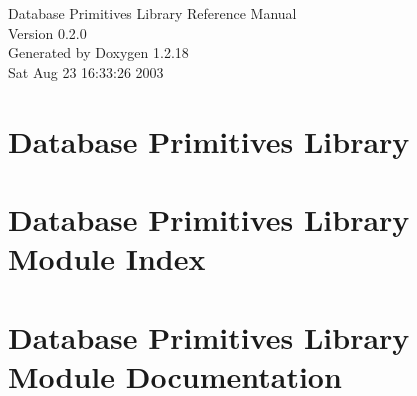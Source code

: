 \documentclass[letterpaper]{book}
\begin{document}
\begin{titlepage}
\vspace*{7cm}
\begin{center}
{\Large Database Primitives Library Reference Manual\\[1ex]\large Version 0.2.0}\\
\vspace*{1cm}
{\large Generated by Doxygen 1.2.18}\\
\vspace*{0.5cm}
{\small Sat Aug 23 16:33:26 2003}\\
\end{center}
\end{titlepage}
\clearemptydoublepage
{}
\tableofcontents
\clearemptydoublepage
{}
\chapter{Database Primitives Library}
\label{index}\hypertarget{index}{}
\chapter{Database Primitives Library Module Index}

\chapter{Database Primitives Library Module Documentation}





\printindex
\end{document}
